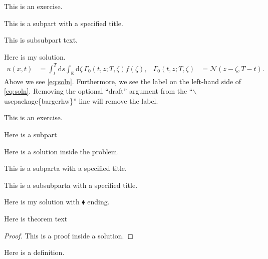 \documentclass[11pt]{article}
\begin{document}
\begin{exercise}
This is an exercise.

	\begin{subpart}
	This is a subpart with a specified title.
		\begin{subsubpart}
		This is subsubpart text.
		\end{subsubpart}
	\end{subpart}

\end{exercise}

\begin{solution}
Here is my solution.
\begin{align}
u(x,t)
	&= \int_t^T \mathrm{d} s \int_{\mathds{R}} \mathrm{d} \zeta\, \Gamma_0\left( t, z; T, \zeta \right) f(\zeta), &
\Gamma_0(t,z;T,\zeta)
	&= \mathcal{N}(z - \zeta, T-t). \label{eq:soln}
\end{align}
Above we see \eqref{eq:soln}. Furthermore, we see the label on the left-hand side of \eqref{eq:soln}. Removing the optional ``draft'' argument from the ``$\backslash$usepackage\{bargerhw\}'' line will remove the label. 
\end{solution}



\begin{exercise}
This is an exercise.

	\begin{subparta}
		Here is a subpart
	\end{subparta}
	\begin{solution}
	Here is a solution inside the problem.
	\end{solution}

	\begin{subparta}
	This is a subparta with a specified title.
		\begin{subsubparta}
		This is a subsubparta with a specified title.
		\end{subsubparta}
	\end{subparta}




\end{exercise}

\begin{solution}[$\blacklozenge$]
Here is my solution with $\blacklozenge$ ending.

\begin{theorem}
Here is theorem text
\end{theorem}
\begin{proof}
	This is a proof inside a solution.
\end{proof}


\begin{definition}
Here is a definition.
\end{definition}
\end{solution}
\end{document}
